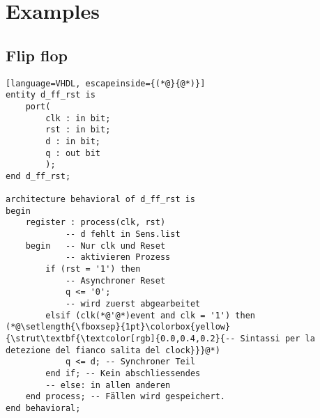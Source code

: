 \section{Examples}
    \subsection{Flip flop}
    \begin{lstlisting}[language=VHDL, escapeinside={(*@}{@*)}]
entity d_ff_rst is
    port(
        clk : in bit;
        rst : in bit;
        d : in bit;
        q : out bit
        );
end d_ff_rst;
    
architecture behavioral of d_ff_rst is
begin
    register : process(clk, rst)
            -- d fehlt in Sens.list
    begin   -- Nur clk und Reset
            -- aktivieren Prozess
        if (rst = '1') then
            -- Asynchroner Reset
            q <= '0';
            -- wird zuerst abgearbeitet
        elsif (clk(*@'@*)event and clk = '1') then (*@\setlength{\fboxsep}{1pt}\colorbox{yellow}{\strut\textbf{\textcolor[rgb]{0.0,0.4,0.2}{-- Sintassi per la detezione del fianco salita del clock}}}@*)
            q <= d; -- Synchroner Teil
        end if; -- Kein abschliessendes
        -- else: in allen anderen
    end process; -- Fällen wird gespeichert.
end behavioral;
    \end{lstlisting}